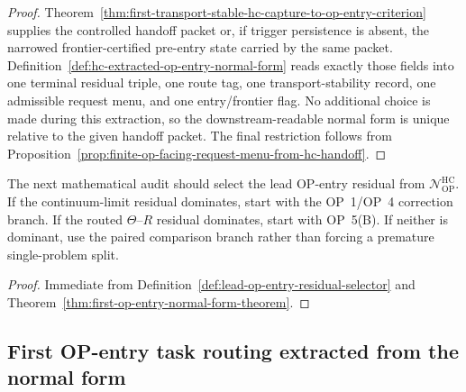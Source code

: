 \begin{proof}
Theorem~\ref{thm:first-transport-stable-hc-capture-to-op-entry-criterion} supplies the controlled handoff packet or, if trigger persistence is absent, the narrowed frontier-certified pre-entry state carried by the same packet. Definition~\ref{def:hc-extracted-op-entry-normal-form} reads exactly those fields into one terminal residual triple, one route tag, one transport-stability record, one admissible request menu, and one entry/frontier flag. No additional choice is made during this extraction, so the downstream-readable normal form is unique relative to the given handoff packet. The final restriction follows from Proposition~\ref{prop:finite-op-facing-request-menu-from-hc-handoff}.
\end{proof}

\begin{corollary}
\label{cor:v3340-r02-working-rule}
The next mathematical audit should select the lead OP-entry residual from $\mathcal N_{\mathrm{OP}}^{\mathrm{HC}}$. If the continuum-limit residual dominates, start with the OP~1/OP~4 correction branch. If the routed $\Theta$--$R$ residual dominates, start with OP~5(B). If neither is dominant, use the paired comparison branch rather than forcing a premature single-problem split.
\end{corollary}

\begin{proof}
Immediate from Definition~\ref{def:lead-op-entry-residual-selector} and Theorem~\ref{thm:first-op-entry-normal-form-theorem}.
\end{proof}

\subsection{First OP-entry task routing extracted from the normal form}
\label{subsec:first-op-entry-task-routing-extracted-from-normal-form}

